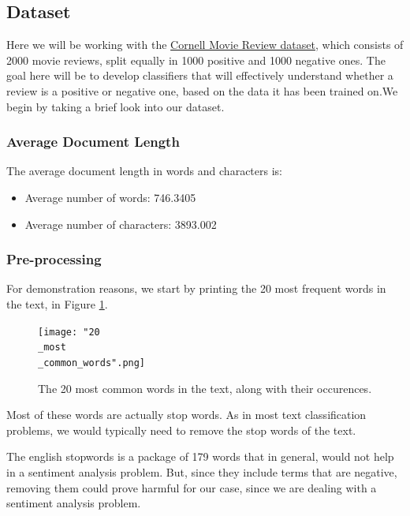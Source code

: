 \documentclass[10pt, a4paper]{article}
\begin{document}
	
	\subsection{Dataset}
	Here we will be working with the \href{http://www.cs.cornell.edu/people/pabo/movie-review-data/}{Cornell Movie Review dataset}, which consists of 2000 movie reviews, split equally in 1000 positive and 1000 negative ones. The goal here will be to develop classifiers that will effectively understand whether a review is a positive or negative one, based on the data it has been trained on.We begin by taking a brief look into our dataset.
	
	
	\subsubsection{Average Document Length }
	
	The average document length in words and characters is:
	\begin{itemize}
		\item Average number of words: 746.3405
		\item Average number of characters: 3893.002
	\end{itemize}
	
	
	
	
	\subsubsection{Pre-processing}
	
	For demonstration reasons, we start by printing the 20 most frequent words in the text, in Figure \ref{fig::20_common}.
	
	\begin{figure}
		\centering
		\texttt{[image: "20\\\_most\\\_common\_words".png]}
		\caption{The 20 most common words in the text, along with their occurences.}
		\label{fig::20_common}
	\end{figure}
	
	
	
	Most of these words are actually stop words. As in most text classification problems, we would typically need to remove the stop words of the text.
	
	The english stopwords is a package of 179 words that in general, would not help in a sentiment analysis problem. But, since they include terms that are negative, removing them could prove harmful for our case, since we are dealing with a sentiment analysis problem.
	
\end{document}

